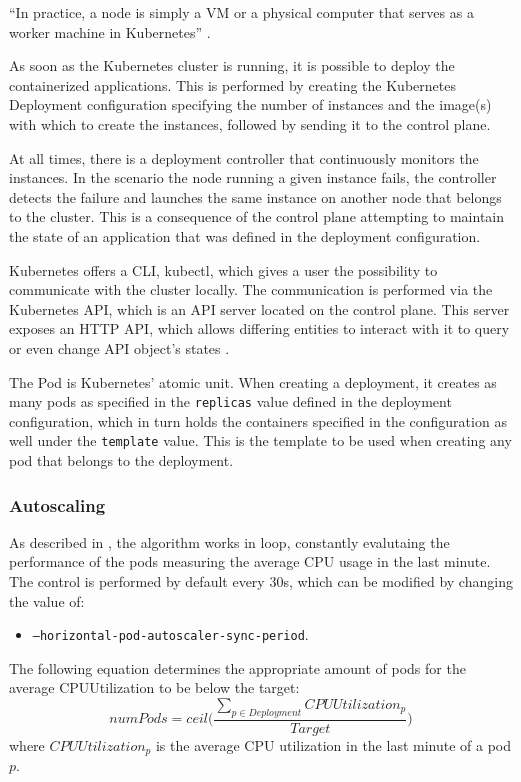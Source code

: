 ``In practice, a node is simply a VM or a physical computer that serves as a worker machine in Kubernetes'' \cite{CreateKubeCluster}.

As soon as the Kubernetes cluster is running, it is possible to deploy the containerized applications. This is performed by creating the Kubernetes Deployment configuration specifying the number of instances and the image(s) with which to create the instances, followed by sending it to the control plane. 

At all times, there is a deployment controller that continuously monitors the instances. In the scenario the node running a given instance fails, the controller detects the failure and launches the same instance on another node that belongs to the cluster. This is a consequence of the control plane attempting to maintain the state of an application that was defined in the deployment configuration.

Kubernetes offers a CLI, kubectl, which gives a user the possibility to communicate with the cluster locally. The communication is performed via the Kubernetes API, which is an API server located on the control plane. This server exposes an HTTP API, which allows differing entities to interact with it to query or even change API object's states \cite{KubernetesAPI}.

The Pod is Kubernetes' atomic unit. When creating a deployment, it creates as many pods as specified in the \texttt{replicas} value defined in the deployment configuration, which in turn holds the containers specified in the configuration as well under the \texttt{template} value. This is the template to be used when creating any pod that belongs to the deployment.

\subsubsection{Autoscaling}

As described in \cite{KubernetesAutoscaling}, the algorithm works in loop, constantly evalutaing the performance of the pods measuring the average CPU usage in the last minute. The control is performed by default every 30s, which can be modified by changing the value of:
\begin{itemize}
    \item \texttt{--horizontal-pod-autoscaler-sync-period}.
\end{itemize}

The following equation determines the appropriate amount of pods for the average CPUUtilization to be below the target:
\begin{equation}
    numPods = ceil\bigg(\frac
        {\sum_{p \in Deployment} CPUUtilization_p}
        {Target}
    \bigg)
\end{equation}
where $CPUUtilization_p$ is the average CPU utilization in the last minute of a pod $p$. 

